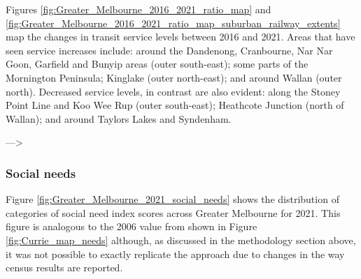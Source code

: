 \documentclass[preprint, 3p,
authoryear]{elsarticle} %
\begin{document}
Figures \ref{fig:Greater_Melbourne_2016_2021_ratio_map} and
\ref{fig:Greater_Melbourne_2016_2021_ratio_map_suburban_railway_extents}
map the changes in transit service levels between 2016 and 2021. Areas
that have seen service increases include: around the Dandenong,
Cranbourne, Nar Nar Goon, Garfield and Bunyip areas (outer south-east);
some parts of the Mornington Peninsula; Kinglake (outer north-east); and
around Wallan (outer north). Decreased service levels, in contrast are
also evident: along the Stoney Point Line and Koo Wee Rup (outer
south-east); Heathcote Junction (north of Wallan); and around Taylors
Lakes and Syndenham.

---\textgreater{}

\hypertarget{social-needs}{%
\subsubsection{Social needs}\label{social-needs}}

Figure \ref{fig:Greater_Melbourne_2021_social_needs} shows the
distribution of categories of social need index scores across Greater
Melbourne for 2021. This figure is analogous to the 2006 value from
\citet{currie2010identifying} shown in Figure \ref{fig:Currie_map_needs}
although, as discussed in the methodology section above, it was not
possible to exactly replicate the \citet{currie2010identifying} approach
due to changes in the way census results are reported.
\end{document}
